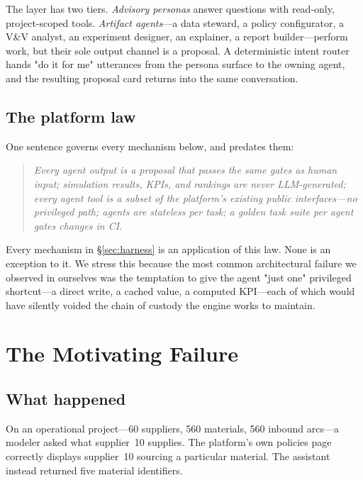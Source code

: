 \documentclass[conference]{IEEEtran}
\begin{document}
The layer has two tiers. \emph{Advisory personas} answer questions with read-only,
project-scoped tools. \emph{Artifact agents}---a data steward, a policy
configurator, a V\&V analyst, an experiment designer, an explainer, a report
builder---perform work, but their sole output channel is a proposal. A
deterministic intent router hands "do it for me" utterances from the persona
surface to the owning agent, and the resulting proposal card returns into the
same conversation.

\subsection{The platform law}

One sentence governs every mechanism below, and predates them:

\begin{quote}
\itshape
Every agent output is a proposal that passes the same gates as human input;
simulation results, KPIs, and rankings are never LLM-generated; every agent tool
is a subset of the platform's existing public interfaces---no privileged path;
agents are stateless per task; a golden task suite per agent gates changes in CI.
\end{quote}

Every mechanism in \S\ref{sec:harness} is an application of this law. None is an
exception to it. We stress this because the most common architectural failure we
observed in ourselves was the temptation to give the agent "just one" privileged
shortcut---a direct write, a cached value, a computed KPI---each of which would
have silently voided the chain of custody the engine works to maintain.

\section{The Motivating Failure}
\label{sec:incident}

\subsection{What happened}

On an operational project---60 suppliers, 560 materials, 560 inbound arcs---a modeler
asked what supplier~10 supplies. The platform's own policies page correctly
displays supplier~10 sourcing a particular material. The assistant instead
returned five material identifiers.
\end{document}
